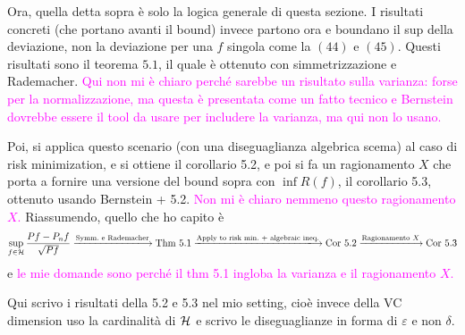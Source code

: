 \documentclass[reqno]{amsart}
\newcommand{\mati}[1]{\textcolor{magenta}{#1}}
\begin{document}

\bigskip

Ora, quella detta sopra è solo la logica generale di questa sezione. I risultati concreti (che portano avanti il bound) invece partono ora e boundano il sup della deviazione, non la deviazione per una $f$ singola come la $(44)$ e $(45)$. Questi risultati sono il teorema $5.1$, il quale è ottenuto con simmetrizzazione e Rademacher. \mati{Qui non mi è chiaro perché sarebbe un risultato sulla varianza: forse per la normalizzazione, ma questa è presentata come un fatto tecnico e Bernstein dovrebbe essere il tool da usare per includere la varianza, ma qui non lo usano. }

Poi, si applica questo scenario (con una diseguaglianza algebrica scema) al caso di risk minimization, e si ottiene il corollario 5.2, e poi si fa un ragionamento $X$ che porta a fornire una versione del bound sopra con $\inf R(f)$, il corollario 5.3, ottenuto usando Bernstein + 5.2. \mati{Non mi è chiaro nemmeno questo ragionamento $X$. }Riassumendo, quello che ho capito è
\[
\sup_{f\in\cH}\frac{Pf -P_n f}{\sqrt{Pf}} \xlongrightarrow{\text{Symm.\ e Rademacher}}  \text{Thm } 5.1 \xlongrightarrow{\text{Apply to risk min.\ + algebraic ineq.}} \text{Cor } 5.2 \xlongrightarrow{\text{Ragionamento }X} \text{Cor } 5.3
\]
e \mati{le mie domande sono perché il thm 5.1 ingloba la varianza e il ragionamento $X$.}
\bigskip

Qui scrivo i risultati della 5.2 e 5.3 nel mio setting, cioè invece della VC dimension uso la cardinalità di $\mathcal{H}$ e scrivo le diseguaglianze in forma di $\varepsilon$ e non $\delta$. 
\bigskip
\end{document}
